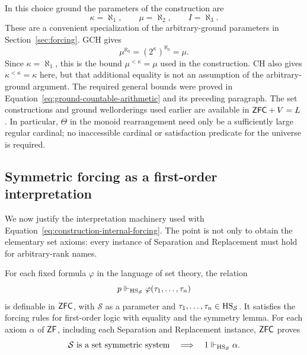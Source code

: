 In this choice ground the parameters of the construction are
\[
 \kappa=\aleph_1,\qquad \mu=\aleph_2,\qquad I=\aleph_3.
\]
These are a convenient specialization of the arbitrary-ground
parameters in Section~\ref{sec:forcing}. GCH gives
\[
 \mu^{\aleph_0}=(2^\kappa)^{\aleph_0}=\mu.
\]
Since $\kappa=\aleph_1$, this is the bound
$\mu^{<\kappa}=\mu$ used in the construction. CH also gives
$\kappa^{<\kappa}=\kappa$ here, but that additional equality is
not an assumption of the arbitrary-ground argument. The required
general bounds were proved in
Equation~\eqref{eq:ground-countable-arithmetic} and its preceding
paragraph. The set constructions and ground wellorderings used
earlier are available in $\mathsf{ZFC}+V=L$. In particular, $\Theta$ in
the monoid rearrangement need only be a sufficiently large regular
cardinal; no inaccessible cardinal or satisfaction predicate for
the universe is required.

\subsection{Symmetric forcing as a first-order interpretation}

We now justify the interpretation machinery used with
Equation~\eqref{eq:construction-internal-forcing}. The point is
not only to obtain the elementary set axioms: every instance of
Separation and Replacement must hold for arbitrary-rank names.

\begin{lemma}
\label{lem:symmetric-forcing-schema}
For each fixed formula $\varphi$ in the language of set theory,
the relation
\[
 p\Vdash_{\mathrm{HS}_{\mathcal S}}\varphi(\tau_1,\ldots,\tau_n)
\]
is definable in $\mathsf{ZFC}$, with $\mathcal S$ as a parameter and
$\tau_1,\ldots,\tau_n\in\mathrm{HS}_{\mathcal S}$.
It satisfies the forcing rules for first-order logic with equality
and the symmetry lemma. For each axiom $\alpha$ of $\mathsf{ZF}$,
including each Separation and Replacement instance, $\mathsf{ZFC}$
proves
\[
 \mathcal S\text{ is a set symmetric system}
 \quad\Longrightarrow\quad
 1\Vdash_{\mathrm{HS}_{\mathcal S}}\alpha.
\]
\end{lemma}

